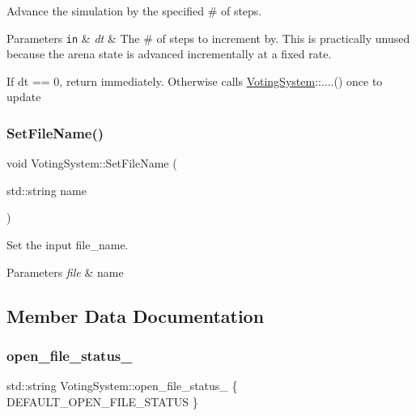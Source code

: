 Advance the simulation by the specified \# of steps. 


\begin{DoxyParams}[1]{Parameters}
\mbox{\tt in}  & {\em dt} & The \# of steps to increment by. This is practically unused because the arena state is advanced incrementally at a fixed rate.\\
\hline
\end{DoxyParams}
If {\ttfamily dt == 0}, {\ttfamily return} immediately. Otherwise calls \hyperlink{classVotingSystem}{Voting\+System}\+:\+:....() once to update \mbox{\label{classVotingSystem_a4c6d3ece9023dc618100fa65a536ccf5}} 
\subsubsection{\texorpdfstring{Set\+File\+Name()}{SetFileName()}}
{\footnotesize\ttfamily void Voting\+System\+::\+Set\+File\+Name (\begin{DoxyParamCaption}\item[{std\+::string}]{name }\end{DoxyParamCaption})\hspace{0.3cm}{\ttfamily [inline]}}



Set the input file\+\_\+name. 


\begin{DoxyParams}{Parameters}
{\em file} & name \\
\hline
\end{DoxyParams}


\subsection{Member Data Documentation}
\mbox{\label{classVotingSystem_a90e53d556d9dc2117690b34d9dfb7ac4}} 
\subsubsection{\texorpdfstring{open\+\_\+file\+\_\+status\+\_\+}{open\_file\_status\_}}
{\footnotesize\ttfamily std\+::string Voting\+System\+::open\+\_\+file\+\_\+status\+\_\+ \{ D\+E\+F\+A\+U\+L\+T\+\_\+\+O\+P\+E\+N\+\_\+\+F\+I\+L\+E\+\_\+\+S\+T\+A\+T\+US \}}

